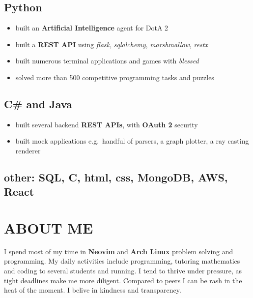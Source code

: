 \documentclass{article}
\begin{document}
\subsection{Python}
\begin{itemize}
        \itemsep0em
        \item built an {\bfseries Artificial Intelligence} agent for DotA 2
        \item built a {\bfseries REST API} using \textit{flask}, \textit{sqlalchemy}, \textit{marshmallow}, \textit{restx}
        \item built numerous terminal applications and games with \textit{blessed}
        \item solved more than 500 competitive programming tasks and puzzles
\end{itemize}

\subsection{C\# and Java}
\begin{itemize}
        \itemsep0em
        \item built several backend {\bfseries REST APIs}, with {\bfseries OAuth 2} security
        \item built mock applications e.g.\ handful of parsers, a graph plotter, a ray casting renderer
\end{itemize}

\subsection{other: SQL, C, html, css, MongoDB, AWS, React}

\section{ABOUT ME}
I spend most of my time in {\bfseries Neovim} and {\bfseries Arch Linux} problem solving and programming.
My daily activities include programming, tutoring mathematics and coding to several students and running.
I tend to thrive under pressure, as tight deadlines make me more diligent.
Compared to peers I can be rash in the heat of the moment.
I belive in kindness and transparency.
\end{document}
